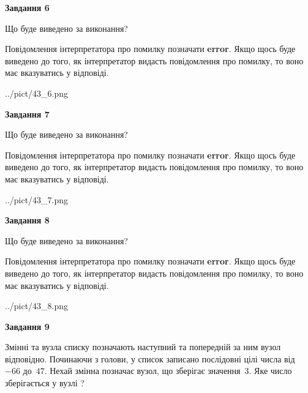\documentclass[12pt, ukrainian]{article}
\begin{document}
{\begin {large}
{\begin {center}\textbf{Завдання 6}\end {center}}\par
Що буде виведено за виконання?

Повідомлення інтерпретатора про помилку позначати \textbf{error}.
Якщо щось буде виведено до того, як інтерпретатор видасть повідомлення про помилку, 
то воно має вказуватись у відповіді. \par


\begin{center}
	{../pict/43_6.png}
\end{center}
\newpage

{\begin {center}\textbf{Завдання 7}\end {center}}\par
Що буде виведено за виконання?

Повідомлення інтерпретатора про помилку позначати \textbf{error}.
Якщо щось буде виведено до того, як інтерпретатор видасть повідомлення про помилку, 
то воно має вказуватись у відповіді. \par


\begin{center}
	{../pict/43_7.png}
\end{center}
\newpage

{\begin {center}\textbf{Завдання 8}\end {center}}\par
Що буде виведено за виконання?

Повідомлення інтерпретатора про помилку позначати \textbf{error}.
Якщо щось буде виведено до того, як інтерпретатор видасть повідомлення про помилку, 
то воно має вказуватись у відповіді. \par


\begin{center}
	{../pict/43_8.png}
\end{center}
\newpage

{\begin {center}\textbf{Завдання 9}\end {center}}\par
Змінні  та  вузла списку позначають наступний та попередній за ним вузол відповідно. Починаючи з голови, у список записано послідовні цілі числа від~$-66$ до~$47$. Нехай змінна  позначає вузол, що зберігає значення~$3$.
Яке число зберігається у вузлі  ?\par
\newpage


\end{large}}
\end{document}
